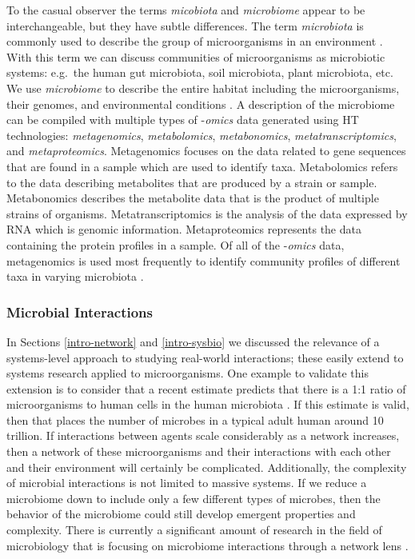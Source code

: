 To the casual observer the terms \textit{micobiota} and \textit{microbiome} appear to be interchangeable, but they have subtle differences. The term \textit{microbiota} is commonly used to describe the group of microorganisms in an environment \citep{Marchesi2015}. With this term we can discuss communities of microorganisms as microbiotic systems: e.g.\ the human gut microbiota, soil microbiota,  plant microbiota, etc. We use \textit{microbiome} to describe the entire habitat including the microorganisms, their genomes, and environmental conditions \citep{Marchesi2015}. A description of the microbiome can be compiled with multiple types of -\textit{omics} data generated using \acrshort{HT} technologies: \textit{metagenomics}, \textit{metabolomics}, \textit{metabonomics}, \textit{metatranscriptomics}, and \textit{metaproteomics}. Metagenomics focuses on the data related to gene sequences that are found in a sample which are used to identify taxa.  Metabolomics refers to the data describing metabolites that are produced by a strain or sample. Metabonomics describes the metabolite data that is the product of multiple strains of organisms. Metatranscriptomics is the analysis of the data expressed by \acrfull{RNA} which is genomic information. Metaproteomics represents the data containing the protein profiles in a sample. Of all of the -\textit{omics} data, metagenomics is used most frequently to identify community profiles of different taxa in varying microbiota \citep{Knight2018}. 

\subsubsection{Microbial Interactions}\label{intro-mic-def}
In Sections \ref{intro-network} and \ref{intro-sysbio} we discussed the relevance of a systems-level approach to studying real-world interactions; these easily extend to systems research applied to microorganisms. One example to validate this extension is to consider that a recent estimate predicts that there is a 1:1 ratio of microorganisms to human cells in the human microbiota \citep{Sender2016}. If this estimate is valid, then that places the number of microbes in a typical adult human around 10 trillion. If interactions between agents scale considerably as a network increases, then a network of these microorganisms and their interactions with each other and their environment will certainly be complicated. Additionally, the complexity of microbial interactions is not limited to massive systems. If we reduce a microbiome down to include only a few different types of microbes, then the behavior of the microbiome could still develop emergent properties and complexity. There is currently a significant amount of research in the field of microbiology that is focusing on microbiome interactions through a network lens \citep{Layeghifard2017}.

